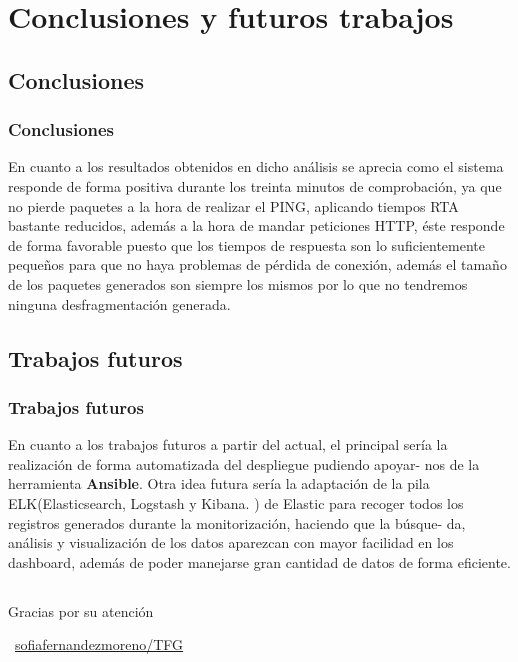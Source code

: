 \documentclass{beamer}
\theoremstyle{plain}
\theoremstyle{definition}
\theoremstyle{plain}
\theoremstyle{definition}
\theoremstyle{remark}
\theoremstyle{definition}
\begin{document}
\section{Conclusiones y futuros trabajos}
\subsection{Conclusiones}
\begin{frame}
	\frametitle{Conclusiones}
	En cuanto a los resultados obtenidos en dicho análisis se aprecia
	como el sistema responde de forma positiva durante los treinta minutos de
	comprobación, ya que no pierde paquetes a la hora de realizar el PING,
	aplicando tiempos RTA bastante reducidos, además a la hora de mandar
	peticiones HTTP, éste responde de forma favorable puesto que los tiempos
	de respuesta son lo suficientemente pequeños para que no haya problemas
	de pérdida de conexión, además el tamaño de los paquetes generados son
	siempre los mismos por lo que no tendremos ninguna desfragmentación generada.
	
\end{frame}
\subsection{Trabajos futuros}
\begin{frame}
	\frametitle{Trabajos futuros}
En cuanto a los trabajos futuros a partir del actual, el principal
sería la realización de forma automatizada del despliegue pudiendo apoyar-
nos de la herramienta \textbf{Ansible}. Otra idea futura sería la adaptación de la
pila ELK(Elasticsearch, Logstash y Kibana. ) de Elastic para recoger todos
los registros generados durante la monitorización, haciendo que la búsque-
da, análisis y visualización de los datos aparezcan con mayor facilidad en
los dashboard, además de poder manejarse gran cantidad de datos de forma
eficiente.	
\end{frame}
\subsection{}
\begin{frame}{}{}
	\Huge{\centerline{Gracias por su atención}}
	\centerline{\Huge{\raisebox{-.25\height}\faGithub}~\large{\href{https://github.com/sofiafernandezmoreno/TFG}{\alert{sofiafernandezmoreno/TFG}}}}

\end{frame}
\end{document}
